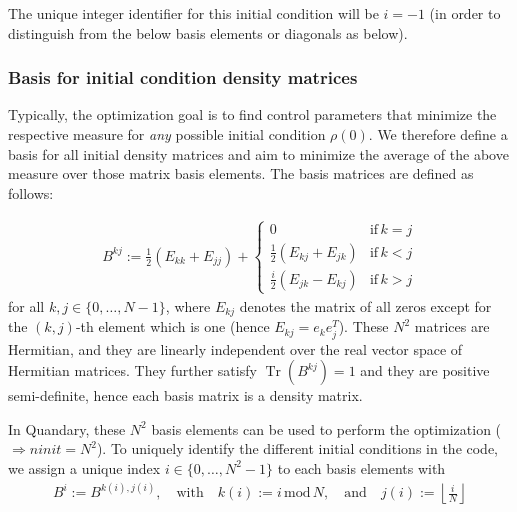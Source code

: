 \documentclass[11pt]{article}
\DeclareMathOperator{\Tr}{Tr}
\begin{document}
The unique integer identifier for
this initial condition will be $i=-1$ (in order to distinguish from the below
basis elements or diagonals as below). 

\subsubsection{Basis for initial condition density matrices}
Typically, the optimization goal is to find control parameters that minimize the
respective measure for \textit{any} possible initial condition $\rho(0)$. We
therefore define a basis for all initial density matrices and aim to minimize
the average of the above measure over those matrix basis elements. The basis
matrices are defined as follows:

\begin{align}
B^{kj} := \frac 12 \left( E_{kk} + E_{jj}\right) +  \begin{cases} 
          0 & \text{if} \, k=j \\ 
        \frac 12 \left( E_{kj} + E_{jk}\right) & \text{if} \, k<j \\
        \frac i2 \left( E_{jk} - E_{kj}\right) & \text{if} \, k>j
      \end{cases} 
\end{align}
for all $k,j\in\{0,\dots, N-1\}$, where $E_{kj}$ denotes the matrix of all zeros
except for the $(k,j)$-th element which is one (hence $E_{kj} = e_ke_j^T$).
These $N^2$ matrices are Hermitian, and they are linearly independent over the
real vector space of Hermitian matrices. They further satisfy $\Tr(B^{kj}) = 1$
and they are positive semi-definite, hence each basis matrix is a density
matrix. 

In Quandary, these $N^2$ basis elements can be used to perform the optimization ($\Rightarrow ninit=N^2$). To uniquely identify the different initial conditions in the code, we assign a
unique index $i \in \{0,\dots, N^2-1\}$ to each basis elements with 
\begin{align*}
  B^i := B^{k(i), j(i)}, \quad \text{with} \quad k(i) := i \,\mbox{mod}\, N,
  \quad \text{and} \quad j(i) := \left\lfloor \frac{i}{N} \right\rfloor
\end{align*}
\end{document}
